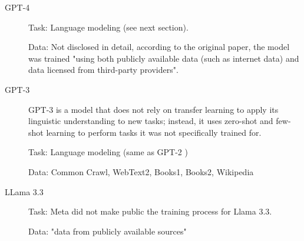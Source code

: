 \begin{description}
	\item[GPT-4] \cite{openaiGPT4TechnicalReport2024}

	      Task: Language modeling (see next section).

	      Data: Not disclosed in detail, according to the original paper, the model was trained "using both publicly available data (such as internet data) and data licensed from third-party providers".
	\item[GPT-3] \cite{brownLanguageModelsAre2020}
	      GPT-3 is a model that does not rely on transfer learning to apply its linguistic understanding to new tasks; instead, it uses zero-shot and few-shot learning to perform tasks it was not specifically trained for.

	      Task: Language modeling (same as GPT-2 \cite{radfordLanguageModelsAre2019})

	      Data: Common Crawl, WebText2, Books1, Books2, Wikipedia 
	\item[LLama 3.3] \cite{LlamamodelsModelsLlama3_3}


	      Task: Meta did not make public the training process for Llama 3.3.

	      Data: "data from publicly available sources"
\end{description}

